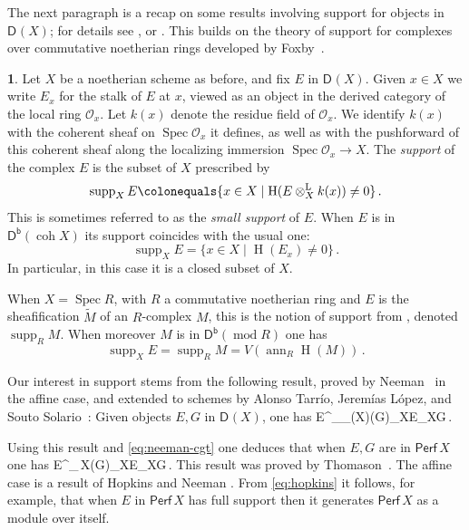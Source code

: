 \documentclass{amsart}
\let\oldequation\equation
\let\oldendequation\endequation
\renewenvironment{equation}{\linenomathNonumbers\oldequation}{\oldendequation\endlinenomath}
\newcommand{\dcat}[2][]{\cat{D}_{#1}(#2)}
\newcommand{\perf}[1]{\mathsf{Perf}\,#1}
\newcommand{\coh}{\operatorname{coh}}
\newcommand{\dbcat}[1]{\cat{D}^{\mathsf{b}}(#1)}
\newcommand{\mco}{\mathcal{O}}
\newcommand{\ann}{\operatorname{ann}}
\newcommand{\cat}[1]{{\mathsf{#1}}}
\newcommand{\hh}{\operatorname{H}}
\newcommand{\Loc}{\operatorname{Loc}}
\newcommand{\lotimes}{\otimes^{\operatorname{L}}}
\newcommand{\rmod}{\operatorname{mod}}
\newcommand{\spec}{\operatorname{Spec}}
\newcommand{\supp}{\operatorname{supp}}
\newcommand{\thick}{\operatorname{thick}}
\theoremstyle{definition}
\newtheorem{chunk}[subsection]{}
\theoremstyle{remark}
\numberwithin{equation}{subsection}
\begin{document}
The next paragraph is a recap on some results involving support for objects in $\dcat X$; for details see \cite[Appendix A]{Iyengar/Lipman/Neeman:2015}, or \cite{StacksProject}. This builds on the theory of support for complexes over commutative noetherian rings developed by Foxby~\cite{Foxby:1979}.

\begin{chunk}
\label{ch:perfect}
Let $X$ be a noetherian scheme as before, and fix $E$ in $\dcat X$. Given $x\in X$ we write $E_x$ for the stalk of $E$ at $x$, viewed as an object in the derived category of the local ring $\mco_{x}$. Let $k(x)$ denote the residue field of $\mco_{x}$. We identify $k(x)$ with the coherent sheaf on $\spec \mco_{x}$ it defines, as well as with the pushforward of this coherent sheaf along the localizing immersion $\spec\mco_{x}\to X$. The \emph{support} of the complex $E$ is the subset of $X$ prescribed by
\[
\supp_X E \colonequals \{x\in X\mid \hh(E\lotimes_X k(x))\ne 0\}\,.
\]
This is sometimes referred to as the \emph{small support} of $E$. When $E$ is in $\dbcat{\coh X}$ its support coincides with the usual one:
\[
\supp_X E = \{x\in X\mid \hh(E_x)\ne 0\}\,.
\]
In particular, in this case it is a closed subset of $X$.

When $X=\spec R$, with $R$ a commutative noetherian ring and $E$ is the sheafification $\widetilde{M}$ of an $R$-complex $M$, this is the notion of support from \cite{Foxby:1979}, denoted $\supp_RM$. When moreover $M$ is in $\dbcat{\rmod R}$ one has
\[
\supp_X E = \supp_RM = V(\ann_R\hh(M))\,.
\]

Our interest in support stems from the following result, proved by Neeman~\cite{Neeman:1992b} in the affine case, and extended to schemes by Alonso Tarr\'io, Jerem\'ias L\'opez, and Souto Solario~\cite{Tarrio/Lopez/Solario:2004}: Given objects $E,G$ in $\dcat X$, one has
\begin{equation}
\label{eq:neeman}
E\in \Loc^{\otimes}_{\dcat X}(G)\Longleftrightarrow \supp_XE\subseteq \supp_XG\,.
\end{equation}

Using this result and \cref{eq:neeman-cgt} one deduces that when $E,G$ are in $\perf X$ one has
\begin{equation}
\label{eq:hopkins}
E\in \thick^{\otimes}_{\perf X}(G)\Longleftrightarrow \supp_XE\subseteq \supp_XG\,.
\end{equation}
This result was proved by Thomason~\cite{Thomason:1997}. The affine case is a result of Hopkins \cite{Hopkins:1987} and Neeman \cite{Neeman:1992b}. From \eqref{eq:hopkins} it follows, for example, that when $E$ in $\perf X$ has full support then it generates $\perf X$ as a module over itself. 
\end{chunk}
\end{document}
